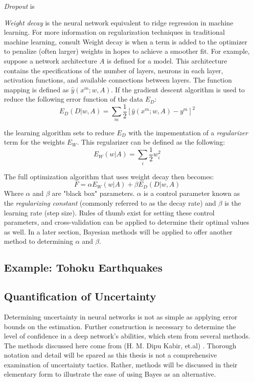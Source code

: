 \textit{Dropout} is \cite{srivastava2014dropout}

\textit{Weight decay} is the neural network equivalent to ridge regression in machine learning.  For more information on regularization techniques in traditional machine learning, consult \cite{Goodfellow-et-al-2016}  Weight decay is when a  term is added to the optimizer to penalize (often larger) weights in hopes to achieve a smoother fit. \cite{mackay1992practical}  For example, suppose a network architecture $A$ is defined for a model.  This architecture contains the specifications of the number of layers, neurons in each layer, activation functions, and available connections between layers.  The function mapping is defined as $\hat{y}(x^m;w,A)$.  If the gradient descent algorithm is used to reduce the following error function of the data $E_D$:
$$
E_D(D|w,A) = \sum_m \frac{1}{2} [\hat{y}(x^m;w,A) - y^m]^2
$$

the learning algorithm sets to reduce $E_D$ with the impementation of a \textit{regularizer} term for the weights $E_W$.  This regularizer can be defined as the following:
$$
E_W(w|A) = \sum_i \frac{1}{2} w_i^2
$$

The full optimization algorithm that uses weight decay then becomes:
$$
F = \alpha E_W(w|A) + \beta E_D(D|w,A)
$$
Where $\alpha$ and $\beta$ are "black box" parameters. \cite{mackay1992practical}  $\alpha$ is a control parameter known as the \textit{regularizing constant} (commonly referred to as the decay rate) and $\beta$ is the learning rate (step size).  Rules of thumb exist for setting these control parameters, and cross-validation can be applied to determine their optimal values as well.  In a later section, Bayesian methods will be applied to offer another method to determining $\alpha$ and $\beta$.


\subsection{Example: Tohoku Earthquakes}





\subsection{Quantification of Uncertainty}

Determining uncertainty in neural networks is not as simple as applying error bounds on the estimation.  Further construction is necessary to determine the level of confidence in a deep network's abilities, which stem from several methods.  The methods discussed here come from (H. M. Dipu Kabir, et.al) \cite{8371683}.  Thorough notation and detail will be spared as this thesis is not a comprehensive examination of uncertainty tactics.  Rather, methods will be discussed in their elementary form to illustrate the ease of using Bayes as an alternative.

